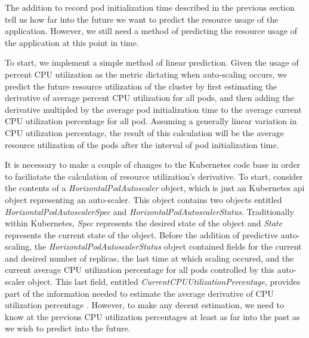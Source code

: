 The addition to record pod initialization time described in the
previous section tell us how far into the future
we want to predict the resource usage of the application. However, we still need
a method of predicting the resource usage of the application at this point in
time.

To start, we implement a simple method of linear prediction. Given the usage of
percent CPU utilization as the metric dictating when auto-scaling occurs, we
predict the future resource utilization of the cluster by first estimating the
derivative of average percent CPU utilization for all pods, and then adding the
derivative multipled by the average pod initialization time to the average current CPU
utilization percentage for all pod. Assuming a generally linear variation in CPU
utilization percentage, the result of this calculation will be the average resource
utilization of the pods after the interval of pod initialization time.

It is necessary to make a couple of changes to the Kubernetes code base in order
to faciliatate the calculation of resource utilization's derivative. To start,
consider the contents of a \textit{HorizontalPodAutoscaler} object, which is
just an Kubernetes api object representing an auto-scaler. This object contains
two objects entitled \textit{HorizontalPodAutoscalerSpec} and
\textit{HorizontalPodAutoscalerStatus}. Traditionally within
Kubernetes, \textit{Spec} represents the desired state of the object and
\textit{State} represents the current state of the object. Before the addition
of predictive auto-scaling, the \textit{HorizontalPodAutoscalerStatus} object
contained fields for the current and desired number of replicas, the last time
at which scaling occured, and the current average CPU utilization percentage for
all pods controlled by this auto-scaler object. This last field, entitled
\textit{CurrentCPUUtilizationPercentage}, provides part of the information
needed to estimate the average derivative of CPU utilization
percentage \cite{k8s-horizontal-pod-autoscaler-object}.
However, to make any decent estimation, we need to know at the previous CPU
utilization percentages at least as far into the past as we wish to predict into
the future.

